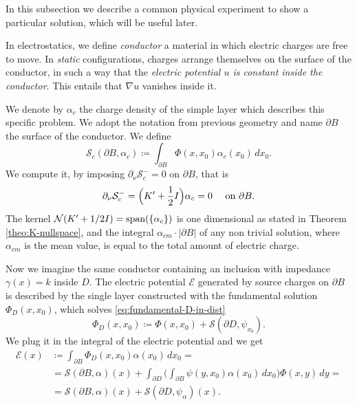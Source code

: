 \documentclass[10pt, a4paper, twoside, openright]{book}
\theoremstyle{definition}
\theoremstyle{plain}
\theoremstyle{plain}
\theoremstyle{plain}
\theoremstyle{plain}
\theoremstyle{plain}
\theoremstyle{plain}
\theoremstyle{plain}
\theoremstyle{plain}
\begin{document}
In this subsection we describe a common physical experiment to show a particular solution, which will be useful later.
\par
In electrostatics, we define \emph{conductor} a material in which electric charges are 
free to move. In \emph{static} configurations,
charges arrange themselves on the surface of the conductor, in such a way that the \emph{electric potential $u$ is constant inside the conductor}. 
This entails that $\nabla u$ vanishes inside it.
\par
We denote by $\alpha_{c}$ the charge density of the simple layer which describes this specific problem. We adopt the notation from previous geometry and name $\partial B$ the surface of the conductor.
We define
\begin{equation}
 \mathcal{S}_{c}(\partial B, \alpha_c)\coloneqq\int_{\partial B}\Phi(x,x_0)\alpha_{c}(x_0)\,dx_0.
\end{equation}
We compute it, by imposing $\partial_\nu \mathcal{S}_{c}^- = 0$ on $\partial B$, that is
\begin{equation}
 \partial_\nu\mathcal{S}_{c}^-=\Bigl(K'+\dfrac{1}{2}I\Bigr)\alpha_{c}= 0\quad\textup{ on }\partial B. \label{eq:alpha_c-equation}
\end{equation}
The kernel $\mathcal{N}(K' + 1/2 I)=\textup{span}(\{\alpha_{c}\})$ is one dimensional as stated in Theorem \ref{theo:K-nullspace}, and the integral $\alpha_{cm} \cdot|\partial B|$ of any non trivial solution, where $\alpha_{cm}$ is the mean value, is equal to the total amount of electric charge.
\par
Now we imagine the same conductor containing an inclusion with impedance $\gamma(x)=k$ inside $D$. The electric potential $\mathcal{E}$ generated by source charges on $\partial B$ is described by the single layer constructed with the fundamental solution $\Phi_D(x,x_0)$, which solves \eqref{eq:fundamental-D-in-dist}
\begin{equation}
 \Phi_D(x,x_0)\coloneqq\Phi(x,x_0)+\mathcal{S}(\partial D,\psi_{x_0}).\label{eq:decomposition-Phi-D}
\end{equation}
We plug it in the integral of the electric potential and we get
\begin{align}
 \mathcal{E}(x)&\coloneqq\int_{\partial B}\Phi_D(x,x_0)\alpha(x_0)\,dx_0= \label{eq:definition-E-c}\\
  &=\mathcal{S}(\partial B, \alpha)(x) + \int_{\partial D} \Big(\int_{\partial B}\psi(y,x_0)\alpha(x_0)\,dx_0\Big)\Phi(x,y)\,dy = \\
  &=\mathcal{S}(\partial B, \alpha)(x) + \mathcal{S}(\partial D, \psi_{\alpha})(x). \label{eq:decomposition-E-c}
\end{align}
\end{document}
